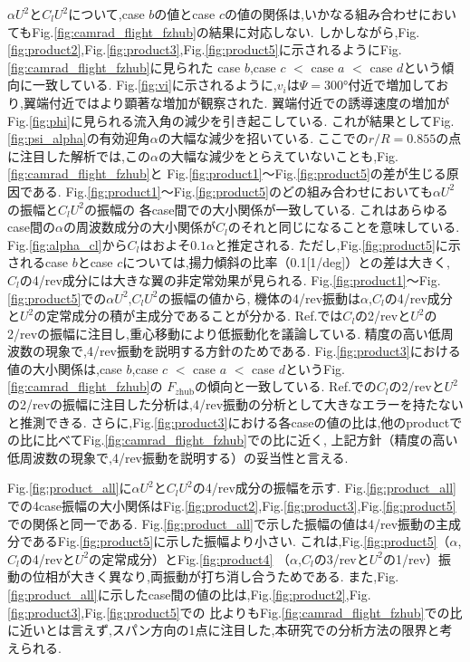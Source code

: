     $\alpha U^2$と$C_l U^2$について,case $b$の値とcase $c$の値の関係は,いかなる組み合わせにおいてもFig.\ref{fig:camrad_flight_fzhub}の結果に対応しない.
    しかしながら,Fig.\ref{fig:product2},Fig.\ref{fig:product3},Fig.\ref{fig:product5}に示されるようにFig.\ref{fig:camrad_flight_fzhub}に見られた
    case $b$,case $c$ $<$ case $a$ $<$ case $d$という傾向に一致している.
    Fig.\ref{fig:vi}に示されるように,$v_i$は$\Psi = 300°$付近で増加しており,翼端付近ではより顕著な増加が観察された.
    翼端付近での誘導速度の増加がFig.\ref{fig:phi}に見られる流入角の減少を引き起こしている.
    これが結果としてFig.\ref{fig:psi_alpha}の有効迎角$\alpha$の大幅な減少を招いている.
    ここでの$r/R= 0.855$の点に注目した解析では,この$\alpha$の大幅な減少をとらえていないことも,Fig.\ref{fig:camrad_flight_fzhub}と
    Fig.\ref{fig:product1}～Fig.\ref{fig:product5}の差が生じる原因である.
    Fig.\ref{fig:product1}～Fig.\ref{fig:product5}のどの組み合わせにおいても$\alpha U^2$の振幅と$C_l U^2$の振幅の
    各case間での大小関係が一致している.
    これはあらゆるcase間の$\alpha$の周波数成分の大小関係が$C_l$のそれと同じになることを意味している.
    Fig.\ref{fig:alpha_cl}から$C_l$はおよそ$0.1\alpha$と推定される.
    ただし,Fig.\ref{fig:product5}に示されるcase $b$とcase $c$については,揚力傾斜の比率（0.1[1/deg]）との差は大きく,
    $C_l$の4/rev成分には大きな翼の非定常効果が見られる.
    Fig.\ref{fig:product1}～Fig.\ref{fig:product5}での$\alpha U^2$,$C_l U^2$の振幅の値から,
    機体の4/rev振動は$\alpha$,$C_l$の4/rev成分と$U^2$の定常成分の積が主成分であることが分かる.
    Ref.\cite{Yoshizaki2023b}では$C_l$の2/revと$U^2$の2/revの振幅に注目し,重心移動により低振動化を議論している.
    精度の高い低周波数の現象で,4/rev振動を説明する方針のためである.
    Fig.\ref{fig:product3}における値の大小関係は,case $b$,case $c$ $<$ case $a$ $<$ case $d$というFig.\ref{fig:camrad_flight_fzhub}の
    $F_{z\mathrm{hub}}$の傾向と一致している.
    Ref.\cite{Yoshizaki2023b}での$C_l$の2/revと$U^2$の2/revの振幅に注目した分析は,4/rev振動の分析として大きなエラーを持たないと推測できる.
    さらに,Fig.\ref{fig:product3}における各caseの値の比は,他のproductでの比に比べてFig.\ref{fig:camrad_flight_fzhub}での比に近く,
    上記方針（精度の高い低周波数の現象で,4/rev振動を説明する）の妥当性と言える.

    \par 
    Fig.\ref{fig:product_all}に$\alpha U^2$と$C_l U^2$の4/rev成分の振幅を示す.
    Fig.\ref{fig:product_all}での4case振幅の大小関係はFig.\ref{fig:product2},Fig.\ref{fig:product3},Fig.\ref{fig:product5}
    での関係と同一である.
    Fig.\ref{fig:product_all}で示した振幅の値は4/rev振動の主成分であるFig.\ref{fig:product5}に示した振幅より小さい.
    これは,Fig.\ref{fig:product5}（$\alpha$,$C_l$の4/revと$U^2$の定常成分）とFig.\ref{fig:product4}
    （$\alpha$,$C_l$の3/revと$U^2$の1/rev）振動の位相が大きく異なり,両振動が打ち消し合うためである.
    また,Fig.\ref{fig:product_all}に示したcase間の値の比は,Fig.\ref{fig:product2},Fig.\ref{fig:product3},Fig.\ref{fig:product5}での
    比よりもFig.\ref{fig:camrad_flight_fzhub}での比に近いとは言えず,スパン方向の1点に注目した,本研究での分析方法の限界と考えられる.

